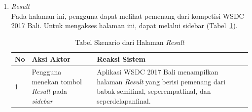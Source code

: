 \begin{enumerate}
	\newpage
	\item \textit{Result} \\ 
	Pada halaman ini, pengguna dapat melihat pemenang dari kompetisi WSDC 2017 Bali. Untuk mengakses halaman ini, dapat melalui sidebar (Tabel~\ref{table:skenarioHalamanHasil}).
		\begin{table}[H]
			\centering
			\begin{tabular}{|p{0.5cm}|p{7cm}|p{7cm}|}
				\hline
				No & Aksi Aktor                               & Reaksi Sistem                                          \\ \hline
				1  & Pengguna menekan tombol \textit{Result} pada \textit{sidebar} & Aplikasi WSDC 2017 Bali menampilkan halaman \textit{Result} yang berisi pemenang dari babak semifinal, seperempatfinal, dan seperdelapanfinal. \\ \hline
			\end{tabular}
			\caption{Tabel Skenario dari Halaman \textit{Result}}
			\label{table:skenarioHalamanHasil}
		\end{table}


\end{enumerate}
